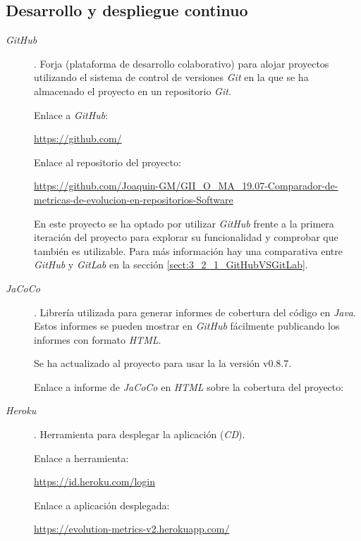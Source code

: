 \subsection{Desarrollo y despliegue continuo}
\begin{description}
	\item[\textit{GitHub}]. Forja (plataforma de desarrollo colaborativo) para alojar proyectos utilizando el sistema de control de versiones \textit{Git} en la que se ha almacenado el proyecto en un repositorio \textit{Git}.
	
		Enlace a \textit{GitHub}:
		
		\url{https://github.com/}
		
		Enlace al repositorio del proyecto:
		
		\url{https://github.com/Joaquin-GM/GII_O_MA_19.07-Comparador-de-metricas-de-evolucion-en-repositorios-Software}
		
		En este proyecto se ha optado por utilizar \textit{GitHub} frente a la primera iteración del proyecto \cite{TFGPrevio} para explorar su funcionalidad y comprobar que también es utilizable. Para más información hay una comparativa entre \textit{GitHub} y \textit{GitLab} en la sección \ref{sect:3_2_1_GitHubVSGitLab}.
		
	
		 
		 
		 
	
	\item[\textit{JaCoCo}]. Librería utilizada para generar informes de cobertura del código en \textit{Java}. Estos informes se pueden mostrar en \textit{GitHub} fácilmente publicando los informes con formato \textit{HTML}. 
	
		Se ha actualizado al proyecto para usar la la versión v0.8.7. 
		
		
		
		Enlace a informe de \textit{JaCoCo} en \textit{HTML} sobre la cobertura del proyecto:
		
	
	\item[\textit{Heroku}]. Herramienta para desplegar la aplicación (\textit{CD}).
	
		Enlace a herramienta:
		
		\url{https://id.heroku.com/login}
		
		Enlace a aplicación desplegada:
		
		\url{https://evolution-metrics-v2.herokuapp.com/}
	
\end{description}
